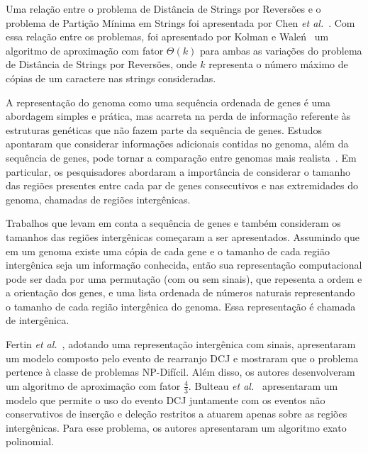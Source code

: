 Uma relação entre o problema de Distância de Strings por Reversões e o problema de Partição Mínima em Strings foi apresentada por Chen \textit{et al.}~\cite{2005-chen-etal}. Com essa relação entre os problemas, foi apresentado por Kolman e Wale{\'n}~\cite{2006-kolman-walen} um algoritmo de aproximação com fator $\Theta(k)$ para ambas as variações do problema de Distância de Strings por Reversões, onde $k$ representa o número máximo de cópias de um caractere nas strings consideradas.

A representação do genoma como uma sequência ordenada de genes é uma abordagem simples e prática, mas acarreta na perda de informação referente às estruturas genéticas que não fazem parte da sequência de genes. Estudos apontaram que considerar informações adicionais contidas no genoma, além da sequência de genes, pode tornar a comparação entre genomas mais realista~\cite{2016a-biller-etal, 2016b-biller-etal}. Em particular, os pesquisadores abordaram a importância de considerar o tamanho das regiões presentes entre cada par de genes consecutivos e nas extremidades do genoma, chamadas de regiões intergênicas. 

Trabalhos que levam em conta a sequência de genes e também consideram os tamanhos das regiões intergênicas começaram a ser apresentados. Assumindo que em um genoma existe uma cópia de cada gene e o tamanho de cada região intergênica seja um informação conhecida, então sua representação computacional pode ser dada por uma permutação (com ou sem sinais), que repesenta a ordem e a orientação dos genes, e uma lista ordenada de números naturais representando o tamanho de cada região intergênica do genoma. Essa representação é chamada de intergênica.

Fertin \textit{et al.}~\cite{2017-fertin-etal}, adotando uma representação intergênica com sinais, apresentaram um modelo composto pelo evento de rearranjo DCJ e mostraram que o problema pertence à classe de problemas NP-Difícil. Além disso, os autores desenvolveram um algoritmo de aproximação com fator $\frac{4}{3}$. Bulteau \textit{et al.}~\cite{2016b-bulteau-etal} apresentaram um modelo que permite o uso do evento DCJ juntamente com os eventos não conservativos de inserção e deleção restritos a atuarem apenas sobre as regiões intergênicas. Para esse problema, os autores apresentaram um algoritmo exato polinomial. 

